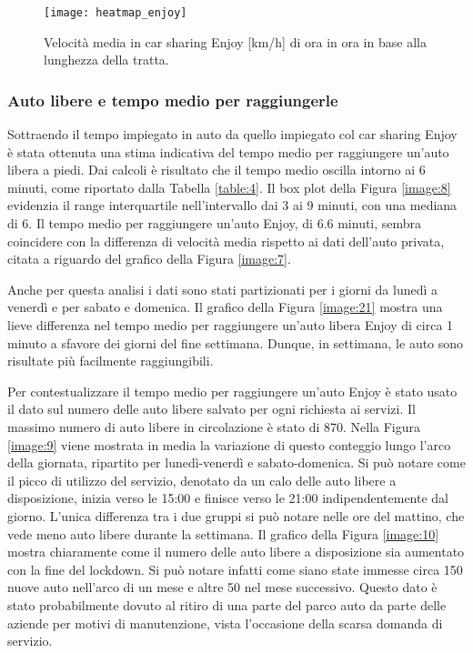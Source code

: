 \begin{figure}
	\centering
	\texttt{[image: heatmap\_enjoy]}
	\caption{Velocità media in car sharing Enjoy [km/h] di ora in ora in base alla lunghezza della tratta.}
	\label{image:30}
\end{figure}

\subsubsection{Auto libere e tempo medio per raggiungerle}

Sottraendo il tempo impiegato in auto da quello impiegato col car sharing Enjoy è stata ottenuta una stima indicativa del tempo medio per raggiungere un'auto libera a piedi. Dai calcoli è risultato che il tempo medio oscilla intorno ai 6 minuti, come riportato dalla Tabella \ref{table:4}. Il box plot della Figura \ref{image:8} evidenzia il range interquartile nell'intervallo dai 3 ai 9 minuti, con una mediana di 6. Il tempo medio per raggiungere un'auto Enjoy, di 6.6 minuti, sembra coincidere con la differenza di velocità media rispetto ai dati dell'auto privata, citata a riguardo del grafico della Figura \ref{image:7}.

Anche per questa analisi i dati sono stati partizionati per i giorni da lunedì a venerdì e per sabato e domenica. Il grafico della Figura \ref{image:21} mostra una lieve differenza nel tempo medio per raggiungere un'auto libera Enjoy di circa 1 minuto a sfavore dei giorni del fine settimana. Dunque, in settimana, le auto sono risultate più facilmente raggiungibili.

Per contestualizzare il tempo medio per raggiungere un'auto Enjoy è stato usato il dato sul numero delle auto libere salvato per ogni richiesta ai servizi. Il massimo numero di auto libere in circolazione è stato di 870. Nella Figura \ref{image:9} viene mostrata in media la variazione di questo conteggio lungo l'arco della giornata, ripartito per lunedì-venerdì e sabato-domenica. Si può notare come il picco di utilizzo del servizio, denotato da un calo delle auto libere a disposizione, inizia verso le 15:00 e finisce verso le 21:00 indipendentemente dal giorno. L'unica differenza tra i due gruppi si può notare nelle ore del mattino, che vede meno auto libere durante la settimana. Il grafico della Figura \ref{image:10} mostra chiaramente come il numero delle auto libere a disposizione sia aumentato con la fine del lockdown. Si può notare infatti come siano state immesse circa 150 nuove auto nell'arco di un mese e altre 50 nel mese successivo. Questo dato è stato probabilmente dovuto al ritiro di una parte del parco auto da parte delle aziende per motivi di manutenzione, vista l'occasione della scarsa domanda di servizio.

